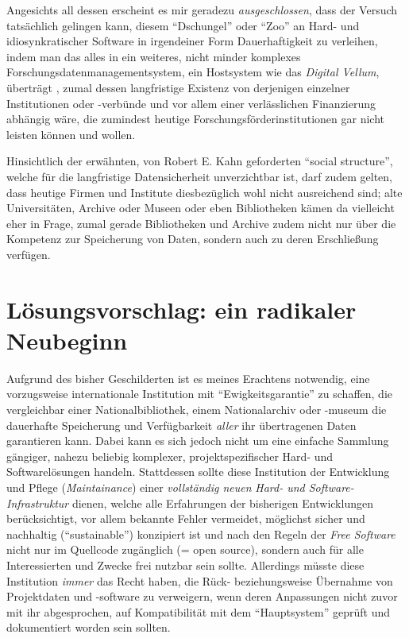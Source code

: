 \documentclass[a4paper,
fontsize=11pt,
oneside,
numbers=noperiodatend,
parskip=half-,
bibliography=totoc,
final
]{scrartcl}
\begin{document}
Angesichts all dessen erscheint es mir geradezu \emph{ausgeschlossen},
dass der Versuch tatsächlich gelingen kann, diesem \enquote{Dschungel}
oder \enquote{Zoo} an Hard- und idiosynkratischer Software in
irgendeiner Form Dauerhaftigkeit zu verleihen, indem man das alles in
ein weiteres, nicht minder komplexes Forschungsdatenmanagementsystem,
ein Hostsystem wie das \emph{Digital Vellum}, überträgt , zumal dessen
langfristige Existenz von derjenigen einzelner Institutionen oder
-verbünde und vor allem einer verlässlichen Finanzierung abhängig wäre,
die zumindest heutige Forschungsförderinstitutionen gar nicht leisten
können und wollen.

Hinsichtlich der erwähnten, von Robert E. Kahn geforderten
\enquote{social structure}, welche für die langfristige Datensicherheit
unverzichtbar ist, darf zudem gelten, dass heutige Firmen und Institute
diesbezüglich wohl nicht ausreichend sind; alte Universitäten, Archive
oder Museen oder eben Bibliotheken kämen da vielleicht eher in Frage,
zumal gerade Bibliotheken und Archive zudem nicht nur über die Kompetenz
zur Speicherung von Daten, sondern auch zu deren Erschließung verfügen.

\hypertarget{luxf6sungsvorschlag-ein-radikaler-neubeginn}{%
\section{Lösungsvorschlag: ein radikaler
Neubeginn}\label{luxf6sungsvorschlag-ein-radikaler-neubeginn}}

Aufgrund des bisher Geschilderten ist es meines Erachtens notwendig,
eine vorzugsweise internationale Institution mit
\enquote{Ewigkeitsgarantie} zu schaffen, die vergleichbar einer
Nationalbibliothek, einem Nationalarchiv oder -museum die dauerhafte
Speicherung und Verfügbarkeit \emph{aller} ihr übertragenen Daten
garantieren kann. Dabei kann es sich jedoch nicht um eine einfache
Sammlung gängiger, nahezu beliebig komplexer, projektspezifischer Hard-
und Softwarelösungen handeln. Stattdessen sollte diese Institution der
Entwicklung und Pflege (\emph{Maintainance}) einer \emph{vollständig
neuen} \emph{Hard- und Software-Infrastruktur} dienen, welche alle
Erfahrungen der bisherigen Entwicklungen berücksichtigt, vor allem
bekannte Fehler vermeidet, möglichst sicher und nachhaltig
(\enquote{sustainable}) konzipiert ist und nach den Regeln der
\emph{Free Software} nicht nur im Quellcode zugänglich (= open source),
sondern auch für alle Interessierten und Zwecke frei nutzbar sein
sollte. Allerdings müsste diese Institution \emph{immer} das Recht
haben, die Rück- beziehungsweise Übernahme von Projektdaten und
-software zu verweigern, wenn deren Anpassungen nicht zuvor mit ihr
abgesprochen, auf Kompatibilität mit dem \enquote{Hauptsystem} geprüft
und dokumentiert worden sein sollten.
\end{document}

